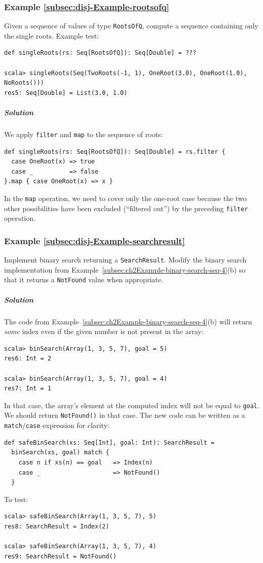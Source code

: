 \subsubsection{Example \label{subsec:disj-Example-rootsofq}\ref{subsec:disj-Example-rootsofq}}

Given a sequence of values of type \lstinline!RootsOfQ!, compute
a sequence containing only the single roots. Example test:
\begin{lstlisting}
def singleRoots(rs: Seq[RootsOfQ]): Seq[Double] = ???

scala> singleRoots(Seq(TwoRoots(-1, 1), OneRoot(3.0), OneRoot(1.0), NoRoots()))
res5: Seq[Double] = List(3.0, 1.0) 
\end{lstlisting}


\subparagraph{Solution}

We apply \lstinline!filter! and \lstinline!map! to the sequence
of roots:
\begin{lstlisting}
def singleRoots(rs: Seq[RootsOfQ]): Seq[Double] = rs.filter {
  case OneRoot(x) => true
  case _          => false
}.map { case OneRoot(x) => x }
\end{lstlisting}
In the \lstinline!map! operation, we need to cover only the one-root
case because the two other possibilities have been excluded (``filtered
out'') by the preceding \lstinline!filter! operation.

\subsubsection{Example \label{subsec:disj-Example-searchresult}\ref{subsec:disj-Example-searchresult}}

Implement binary search returning a \lstinline!SearchResult!. Modify
the binary search implementation from Example~\ref{subsec:ch2Example-binary-search-seq-4}(b)
so that it returns a \lstinline!NotFound! value when appropriate.

\subparagraph{Solution}

The code from Example~\ref{subsec:ch2Example-binary-search-seq-4}(b)
will return \emph{some} index even if the given number is not present
in the array: 
\begin{lstlisting}
scala> binSearch(Array(1, 3, 5, 7), goal = 5)
res6: Int = 2

scala> binSearch(Array(1, 3, 5, 7), goal = 4)
res7: Int = 1
\end{lstlisting}
In that case, the array's element at the computed index will not be
equal to \lstinline!goal!. We should return \lstinline!NotFound()!
in that case. The new code can be written as a \lstinline!match!/\lstinline!case!
expression for clarity:
\begin{lstlisting}
def safeBinSearch(xs: Seq[Int], goal: Int): SearchResult =
  binSearch(xs, goal) match {
    case n if xs(n) == goal   => Index(n) 
    case _                    => NotFound()
  }
\end{lstlisting}
To test:
\begin{lstlisting}
scala> safeBinSearch(Array(1, 3, 5, 7), 5)
res8: SearchResult = Index(2)

scala> safeBinSearch(Array(1, 3, 5, 7), 4)
res9: SearchResult = NotFound()
\end{lstlisting}



